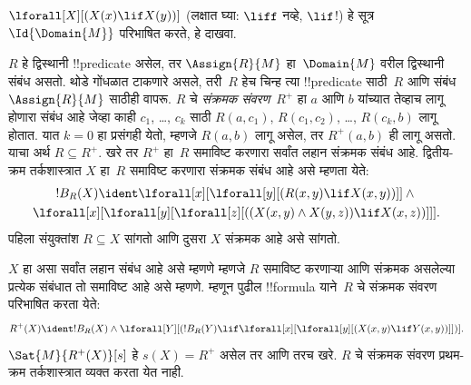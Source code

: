 \documentclass[../../../include/open-logic-section]{subfiles}
\begin{document}
\begin{prob}
$\lforall[X][(X(x) \lif X(y))]$
(लक्षात घ्या:
$\liff$ नव्हे,
$\lif$!)
हे सूत्र
$\Id{\Domain{M}}$
परिभाषित करते,
हे दाखवा.
\end{prob}

\begin{ex}
$R$ हे
द्विस्थानी
!!{predicate}
असेल, तर
$\Assign{R}{M}$
हा~$\Domain{M}$
वरील द्विस्थानी
संबंध असतो.
थोडे गोंधळात
टाकणारे असले,
तरी~$R$ हेच
चिन्ह त्या
!!{predicate}
साठी~$R$ आणि
संबंध~$\Assign{R}{M}$
साठीही वापरू.
$R$ चे
\emph{संक्रमक
संवरण}~$R^+$
हा $a$
आणि $b$
यांच्यात तेव्हाच
लागू होणारा
संबंध आहे
जेव्हा काही
$c_1$, \dots, $c_k$
साठी
$R(a,c_1)$,
$R(c_1, c_2)$,
\dots, $R(c_k,b)$
लागू होतात.
यात $k = 0$
हा प्रसंगही
येतो, म्हणजे
$R(a,b)$
लागू असेल,
तर $R^+(a,b)$
ही लागू असतो.
याचा अर्थ
$R \subseteq R^+$.
खरे तर
$R^+$ हा~$R$
समाविष्ट करणारा
सर्वांत लहान
संक्रमक संबंध
आहे.
द्वितीय-क्रम
तर्कशास्त्रात
$X$ हा~$R$
समाविष्ट करणारा
संक्रमक संबंध
आहे असे
म्हणता येते:
\begin{multline*}
  !B_R(X) \ident \lforall[x][\lforall[y][(R(x,y) \lif X(x, y))]] \land {}\\
\lforall[x][\lforall[y][\lforall[z][((X(x,y) \land X(y,z)) \lif X(x,
      z))]]].
\end{multline*}
पहिला संयुक्तांश
$R \subseteq X$
सांगतो आणि
दुसरा $X$
संक्रमक आहे
असे सांगतो.

$X$ हा
असा सर्वांत
लहान संबंध
आहे असे
म्हणणे म्हणजे
$R$ समाविष्ट
करणाऱ्या
आणि संक्रमक
असलेल्या
प्रत्येक संबंधात
तो समाविष्ट
आहे असे
म्हणणे.
म्हणून
पुढील
!!{formula}
याने~$R$
चे संक्रमक
संवरण
परिभाषित
करता येते:
\[
R^+(X) \ident !B_R(X) \land \lforall[Y][(!B_R(Y) \lif
  \lforall[x][\lforall[y][(X(x, y) \lif Y(x,y))]])].
\]
$\Sat{M}{R^+(X)}[s]$
हे
$s(X) = R^+$
असेल तर आणि
तरच खरे.
$R$ चे
संक्रमक संवरण
प्रथम-क्रम
तर्कशास्त्रात
व्यक्त करता
येत नाही.
\end{ex}
\end{document}
